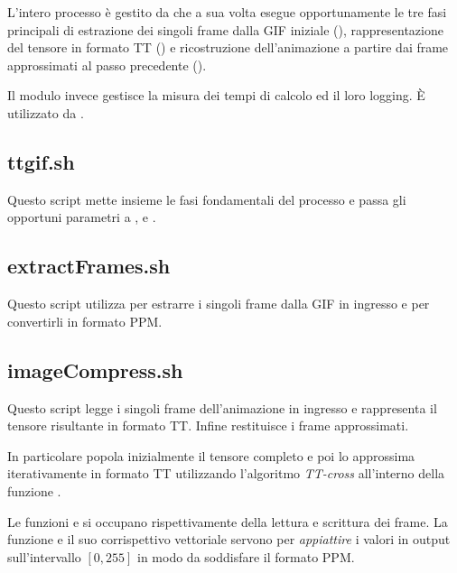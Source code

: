 \documentclass[11pt,a4paper]{article}
\begin{document}
L'intero processo è gestito da  che a sua volta esegue opportunamente le tre fasi principali di estrazione dei singoli frame dalla GIF iniziale (), rappresentazione del tensore in formato TT () e ricostruzione dell'animazione a partire dai frame approssimati al passo precedente ().

Il modulo  invece gestisce la misura dei tempi di calcolo ed il loro logging. È utilizzato da .

\newpage
\def\coderepo{/home/tommaso/Repo/TTGif}
\subsection{ttgif.sh}\label{code:ttgif}
Questo script mette insieme le fasi fondamentali del processo e passa gli opportuni parametri a ,  e .


\newpage
\subsection{extractFrames.sh}\label{code:extractFrames}
Questo script utilizza  per estrarre i singoli frame dalla GIF in ingresso e per convertirli in formato PPM.


\newpage
\subsection{imageCompress.sh}\label{code:imageCompress}
Questo script legge i singoli frame dell'animazione in ingresso e rappresenta il tensore risultante in formato TT. Infine restituisce i frame approssimati.

In particolare  popola inizialmente il tensore completo e poi lo approssima iterativamente in formato TT utilizzando l'algoritmo \emph{TT-cross} all'interno della funzione .

Le funzioni  e  si occupano rispettivamente della lettura e scrittura dei frame. La funzione  e il suo corrispettivo vettoriale  servono per \emph{appiattire} i valori in output sull'intervallo $[0,255]$ in modo da soddisfare il formato PPM.
\end{document}
